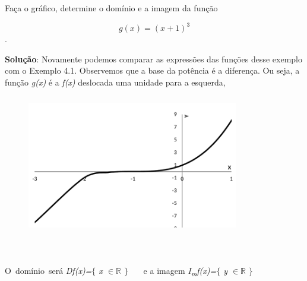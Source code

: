 \begin{texemplo}
Faça o gráfico, determine o domínio e a imagem da função 

\quad  $$ g \left( x \right) = \left( x+1 \right) ^{3}$$.

\begin{justify}
\textbf{Solução}: Novamente podemos comparar as expressões das funções desse exemplo com o Exemplo 4.1. Observemos que a base da potência é a diferença. Ou seja, a função \textit{g(x)} é a \textit{f(x)} deslocada uma unidade para a esquerda,
\end{justify}

\begin{figure}[H]
	\begin{Center}
		\includegraphics[width=3.65in,height=2.41in]{capitulos/outras_funcoes/media/image18.pdf}
	\end{Center}
\end{figure}

~~

\begin{justify}
O~domínio~será   \textit{Df(x)=$ \{ $ x $ \in \mathbb{R} $  \textbf{ }$ \} $ }~~~e a imagem  \textit{I\textsubscript{m}f(x)=$ \{ $ y $ \in \mathbb{R} $  $ \} $ }~ \qedsymbol{}
\end{justify}
\end{texemplo}

